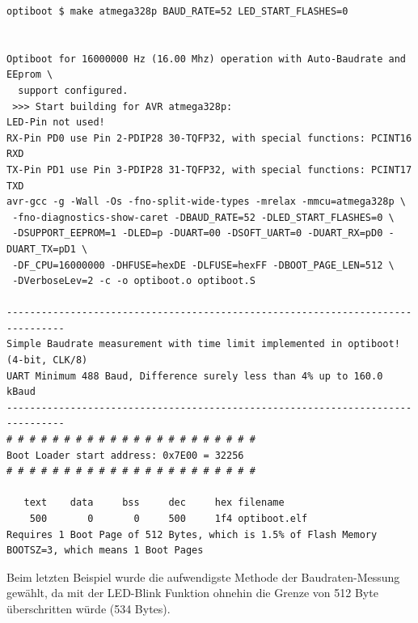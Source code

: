 \begin{verbatim}
optiboot $ make atmega328p BAUD_RATE=52 LED_START_FLASHES=0


Optiboot for 16000000 Hz (16.00 Mhz) operation with Auto-Baudrate and EEprom \
  support configured.
 >>> Start building for AVR atmega328p:
LED-Pin not used!
RX-Pin PD0 use Pin 2-PDIP28 30-TQFP32, with special functions: PCINT16 RXD
TX-Pin PD1 use Pin 3-PDIP28 31-TQFP32, with special functions: PCINT17 TXD
avr-gcc -g -Wall -Os -fno-split-wide-types -mrelax -mmcu=atmega328p \
 -fno-diagnostics-show-caret -DBAUD_RATE=52 -DLED_START_FLASHES=0 \
 -DSUPPORT_EEPROM=1 -DLED=p -DUART=00 -DSOFT_UART=0 -DUART_RX=pD0 -DUART_TX=pD1 \
 -DF_CPU=16000000 -DHFUSE=hexDE -DLFUSE=hexFF -DBOOT_PAGE_LEN=512 \
 -DVerboseLev=2 -c -o optiboot.o optiboot.S

--------------------------------------------------------------------------------
Simple Baudrate measurement with time limit implemented in optiboot! (4-bit, CLK/8)
UART Minimum 488 Baud, Difference surely less than 4% up to 160.0 kBaud
--------------------------------------------------------------------------------
# # # # # # # # # # # # # # # # # # # # # #
Boot Loader start address: 0x7E00 = 32256
# # # # # # # # # # # # # # # # # # # # # #

   text	   data	    bss	    dec	    hex	filename
    500	      0	      0	    500	    1f4	optiboot.elf
Requires 1 Boot Page of 512 Bytes, which is 1.5% of Flash Memory
BOOTSZ=3, which means 1 Boot Pages

\end{verbatim}

Beim letzten Beispiel wurde die aufwendigste Methode der Baudraten-Messung
gewählt, da mit der LED-Blink Funktion ohnehin die Grenze von 512 Byte
überschritten würde (534 Bytes).

